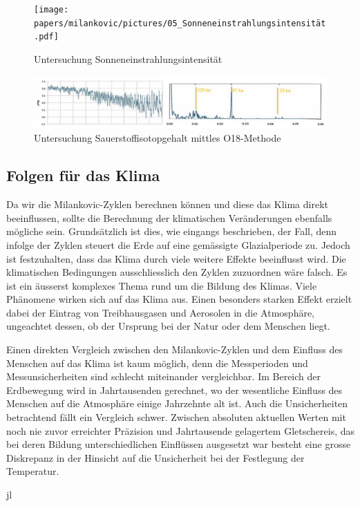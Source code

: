 \begin{figure}
	\centering
	\texttt{[image: papers/milankovic/pictures/05\_Sonneneinstrahlungsintensität.pdf]}
	\caption{Untersuchung Sonneneinstrahlungsintensität
		\label{pictureUntersuchungSonneneinstrahlungsintensität}}
\end{figure}
\begin{figure}
	\centering
	\includegraphics[width=\linewidth]{papers/milankovic/pictures/06_O18-Konzentration.pdf}
	\caption{Untersuchung Sauerstoffisotopgehalt mittles O18-Methode
		\label{pictureUntersuchungKonzentration}}
\end{figure}

\subsection{Folgen für das Klima
	\label{milankovic:subsection:FolgenKlima}}
Da wir die Milankovic-Zyklen berechnen können und diese das Klima direkt beeinflussen, sollte die Berechnung der klimatischen Veränderungen ebenfalls mögliche sein.
Grundsätzlich ist dies, wie eingangs beschrieben, der Fall, denn infolge der Zyklen steuert die Erde auf eine gemässigte Glazialperiode zu.
Jedoch ist festzuhalten, dass das Klima durch viele weitere Effekte beeinflusst wird.
Die klimatischen Bedingungen ausschliesslich den Zyklen zuzuordnen wäre falsch.
Es ist ein äusserst komplexes Thema rund um die Bildung des Klimas.
Viele Phänomene wirken sich auf das Klima aus.
Einen besonders starken Effekt erzielt dabei der Eintrag von Treibhausgasen und Aerosolen in die Atmosphäre, ungeachtet dessen, ob der Ursprung bei der Natur oder dem Menschen liegt.

Einen direkten Vergleich zwischen den Milankovic-Zyklen und dem Einfluss des Menschen auf das Klima ist kaum möglich, denn die Messperioden und Messunsicherheiten sind schlecht miteinander vergleichbar.
Im Bereich der Erdbewegung wird in Jahrtausenden gerechnet, wo der wesentliche Einfluss des Menschen auf die Atmosphäre einige Jahrzehnte alt ist.
Auch die Unsicherheiten betrachtend fällt ein Vergleich schwer.
Zwischen absoluten aktuellen Werten mit noch nie zuvor erreichter Präzision und Jahrtausende gelagertem Gletschereis, das bei deren Bildung unterschiedlichen Einflüssen ausgesetzt war besteht eine grosse Diskrepanz in der Hinsicht auf die Unsicherheit bei der Festlegung der Temperatur.

jl



